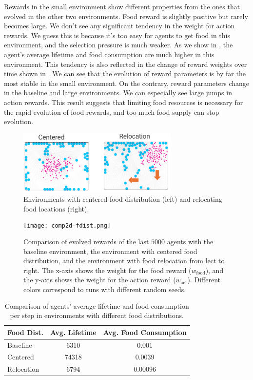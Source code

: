 Rewards in the small environment show different properties from the ones that evolved in the other two environments. Food reward is slightly positive but rarely becomes large. We don't see any significant tendency in the weight for action rewards. We guess this is because it's too easy for agents to get food in this environment, and the selection pressure is much weaker. As we show in , the agent's average lifetime and food consumption are much higher in this environment. This tendency is also reflected in the change of reward weights over time shown in . We can see that the evolution of reward parameters is by far the most stable in the small environment. On the contrary, reward parameters change in the baseline and large environments. We can especially see large jumps in action rewards. This result suggests that limiting food resources is necessary for the rapid evolution of food rewards, and too much food supply can stop evolution.

\begin{figure}[t]
  \centering
  \includegraphics[width=8cm]{resources/centered-and-reloc.png}
  \caption{
    Environments with centered food distribution (left) and relocating food locations (right).
  }\label{figure:env-fdist}
\end{figure}

\begin{figure}[t]
  \centering
  \texttt{[image: comp2d-fdist.png]}
  \caption{
    Comparison of evolved rewards of the last $5000$ agents with the baseline environment, the environment with centered food distribution, and the environment with food relocation from lect to right.
    The x-axis shows the weight for the food reward ($w_{\mathrm{food}}$), and the y-axis shows the weight for the action reward ($w_{\mathrm{act}}$).
    Different colors correspond to runs with different random seeds.
  }\label{figure:result-fdist}
\end{figure}

\begin{table}[t]
    \centering
    \begin{tabular}{lcc}
      \toprule
      Food Dist. &  Avg. Lifetime & Avg. Food Consumption \\
      \midrule
      Baseline & 6310 & 0.001 \\
      Centered &  74318 & 0.0039 \\
      Relocation & 6794 & 0.00096 \\
      \bottomrule
    \end{tabular}
  \caption{
    Comparison of agents' average lifetime and food consumption per step in environments with different food distributions.
  }\label{table:fdist}
\end{table}

